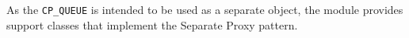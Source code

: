 As the \lstinline!CP_QUEUE! is intended to be used as a separate object, the module provides support classes that implement the Separate Proxy pattern.

% 
% 
% 

